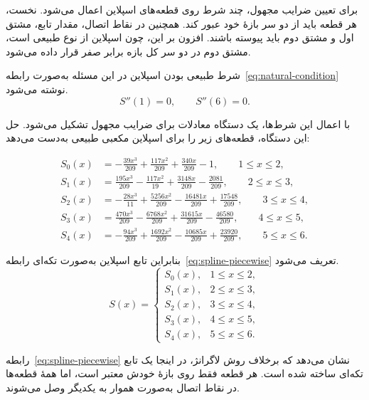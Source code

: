 \documentclass[12pt]{article}
\begin{document}
	برای تعیین ضرایب مجهول، چند شرط روی قطعه‌های اسپلاین اعمال می‌شود. نخست، هر قطعه باید از دو سر بازهٔ خود عبور کند. همچنین در نقاط اتصال، مقدار تابع، مشتق اول و مشتق دوم باید پیوسته باشند. افزون بر این، چون اسپلاین از نوع طبیعی است، مشتق دوم در دو سر کل بازه برابر صفر قرار داده می‌شود.
	
	شرط طبیعی بودن اسپلاین در این مسئله به‌صورت رابطه~\eqref{eq:natural-condition} نوشته می‌شود.
	\begin{equation}
		S''(1)=0,\qquad S''(6)=0.
		\label{eq:natural-condition}
	\end{equation}
	
	با اعمال این شرط‌ها، یک دستگاه معادلات برای ضرایب مجهول تشکیل می‌شود. حل این دستگاه، قطعه‌های زیر را برای اسپلاین مکعبی طبیعی به‌دست می‌دهد:
	
	\begin{align}
		S_0(x) &=
		-\frac{39x^3}{209}
		+\frac{117x^2}{209}
		+\frac{340x}{209}
		-1,
		\qquad 1 \leq x \leq 2,
		\label{eq:s0}
		\\[4pt]
		S_1(x) &=
		\frac{195x^3}{209}
		-\frac{117x^2}{19}
		+\frac{3148x}{209}
		-\frac{2081}{209},
		\qquad 2 \leq x \leq 3,
		\label{eq:s1}
		\\[4pt]
		S_2(x) &=
		-\frac{28x^3}{11}
		+\frac{5256x^2}{209}
		-\frac{16481x}{209}
		+\frac{17548}{209},
		\qquad 3 \leq x \leq 4,
		\label{eq:s2}
		\\[4pt]
		S_3(x) &=
		\frac{470x^3}{209}
		-\frac{6768x^2}{209}
		+\frac{31615x}{209}
		-\frac{46580}{209},
		\qquad 4 \leq x \leq 5,
		\label{eq:s3}
		\\[4pt]
		S_4(x) &=
		-\frac{94x^3}{209}
		+\frac{1692x^2}{209}
		-\frac{10685x}{209}
		+\frac{23920}{209},
		\qquad 5 \leq x \leq 6.
		\label{eq:s4}
	\end{align}
	
	بنابراین تابع اسپلاین به‌صورت تکه‌ای رابطه~\eqref{eq:spline-piecewise} تعریف می‌شود.
	\begin{equation}
		S(x)=
		\begin{cases}
			S_0(x), & 1 \leq x \leq 2,\\
			S_1(x), & 2 \leq x \leq 3,\\
			S_2(x), & 3 \leq x \leq 4,\\
			S_3(x), & 4 \leq x \leq 5,\\
			S_4(x), & 5 \leq x \leq 6.
		\end{cases}
		\label{eq:spline-piecewise}
	\end{equation}
	
	رابطه~\eqref{eq:spline-piecewise} نشان می‌دهد که برخلاف روش لاگرانژ، در اینجا یک تابع تکه‌ای ساخته شده است. هر قطعه فقط روی بازهٔ خودش معتبر است، اما همهٔ قطعه‌ها در نقاط اتصال به‌صورت هموار به یکدیگر وصل می‌شوند.
	
\end{document}
